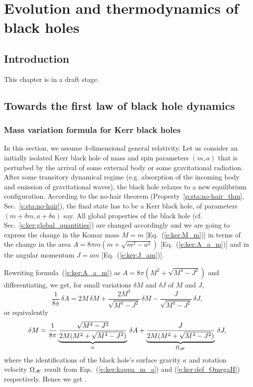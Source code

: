 \chapter{Evolution and thermodynamics of black holes}
\label{s:evo}

\minitoc

\section{Introduction}

This chapter is in a draft stage.

\section{Towards the first law of black hole dynamics}

\subsection{Mass variation formula for Kerr black holes} \label{s:evo:mass_variation_Kerr}

In this section, we assume 4-dimensional general relativity.
Let us consider an initially isolated Kerr black hole of mass and spin parameters $(m,a)$
that is perturbed by the arrival of some external body or some gravitational
radiation. After some transitory dynamical regime (e.g. absorption of the
incoming body and emission of gravitational waves), the black hole relaxes
to a new equilibrium configuration. According to the
no-hair theorem (Property~\ref{p:sta:no-hair_thm}, Sec.~\ref{s:sta:no-hair}),
the final state has to be a Kerr black hole, of
parameters $(m+\delta m, a+\delta a)$ say. All global properties of the black
hole (cf. Sec.~\ref{s:ker:global_quantities})
are changed accordingly and we are going to express the change in
the Komar mass $M = m$ [Eq.~(\ref{e:ker:M_m})] in terms of the change in
the area $A = 8 \pi m (m + \sqrt{m^2-a^2})$ [Eq.~(\ref{e:ker:A_a_m})]
and in the angular momentum $J = a m$ [Eq.~(\ref{e:ker:J_am})].

Rewriting formula~(\ref{e:ker:A_a_m}) as $A = 8 \pi (M^2 + \sqrt{M^4 - J^2})$
and differentiating, we get, for small variations $\delta M$ and $\delta J$
of $M$ and $J$,
\[
\frac{1}{8\pi} \, \delta A =  2 M\,  \delta M + \frac{2M^3}{\sqrt{M^4-J^2}}\, \delta M
    - \frac{J}{\sqrt{M^4-J^2}}\, \delta J ,
\]
or equivalently
\[
    \delta M = \frac{1}{8\pi}
\underbrace{\frac{\sqrt{M^4-J^2}}{2M(M^2+\sqrt{M^4-J^2})}}_{\kappa} \, \delta A
+ \underbrace{\frac{J}{2M(M^2+\sqrt{M^4-J^2})}}_{\Omega_{\mathscr{H}}} \, \delta J  ,
\]
where the identifications of the black hole's surface gravity $\kappa$ and
rotation velocity $\Omega_{\mathscr{H}}$ result from Eqs.~(\ref{e:ker:kappa_m_a})
and (\ref{e:ker:def_OmegaH}) respectively. Hence we get
\be \label{e:evo:mass_variation_Kerr}
     .
\ee

